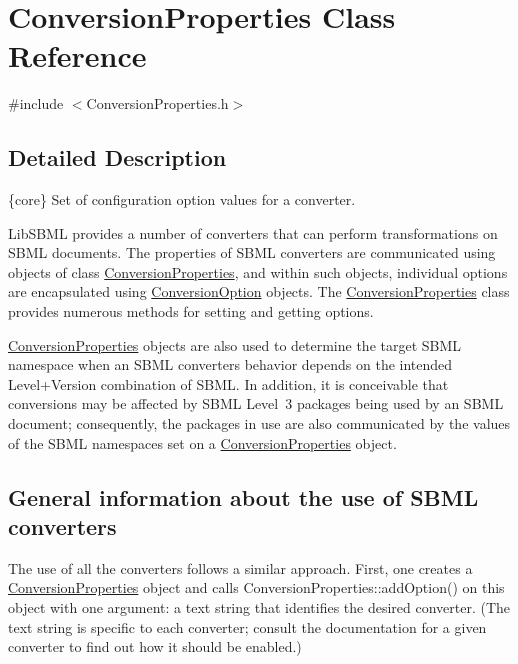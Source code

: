 \hypertarget{class_conversion_properties}{}\section{Conversion\+Properties Class Reference}
\label{class_conversion_properties}


{\ttfamily \#include $<$Conversion\+Properties.\+h$>$}



\subsection{Detailed Description}
\{core\} Set of configuration option values for a converter.



Lib\+S\+B\+ML provides a number of converters that can perform transformations on S\+B\+ML documents. The properties of S\+B\+ML converters are communicated using objects of class \hyperlink{class_conversion_properties}{Conversion\+Properties}, and within such objects, individual options are encapsulated using \hyperlink{class_conversion_option}{Conversion\+Option} objects. The \hyperlink{class_conversion_properties}{Conversion\+Properties} class provides numerous methods for setting and getting options.

\hyperlink{class_conversion_properties}{Conversion\+Properties} objects are also used to determine the target S\+B\+ML namespace when an S\+B\+ML converter\textquotesingle{}s behavior depends on the intended Level+\+Version combination of S\+B\+ML. In addition, it is conceivable that conversions may be affected by S\+B\+ML Level~3 packages being used by an S\+B\+ML document; consequently, the packages in use are also communicated by the values of the S\+B\+ML namespaces set on a \hyperlink{class_conversion_properties}{Conversion\+Properties} object.\hypertarget{classdoc__section__using__sbml__converters_using-converters}{}\subsection{General information about the use of S\+B\+M\+L converters}\label{classdoc__section__using__sbml__converters_using-converters}
The use of all the converters follows a similar approach. First, one creates a \hyperlink{class_conversion_properties}{Conversion\+Properties} object and calls Conversion\+Properties\+::add\+Option() on this object with one argument\+: a text string that identifies the desired converter. (The text string is specific to each converter; consult the documentation for a given converter to find out how it should be enabled.)

